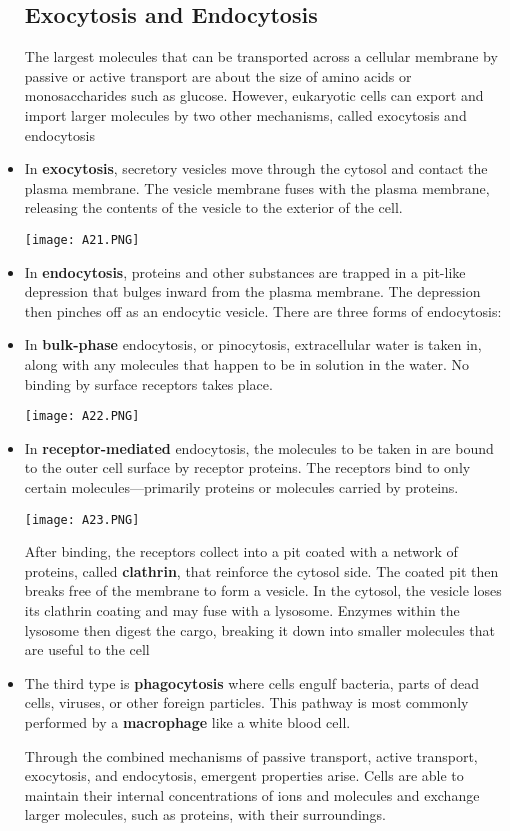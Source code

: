 \documentclass[letterpaper]{article}
\begin{document}
\begin{itemize}
\subsection{Exocytosis and Endocytosis}
\begin{idea}
    The largest molecules that can be transported across a cellular membrane by passive or active transport are about the size of amino acids or monosaccharides such as glucose. However, eukaryotic cells can export and import larger molecules by two other mechanisms, called exocytosis and endocytosis
\end{idea}
\item In \textbf{exocytosis}, secretory vesicles move through the cytosol and contact the plasma membrane. The vesicle membrane fuses with the plasma membrane, releasing the contents of the vesicle to the exterior of the cell.
\begin{center}\texttt{[image: A21.PNG]}\end{center}
\item In \textbf{endocytosis}, proteins and other substances are trapped in a pit-like depression that bulges inward from the plasma membrane. The depression then pinches off as an endocytic vesicle. There are three forms of endocytosis:
\item In \textbf{bulk-phase} endocytosis, or pinocytosis, extracellular water is taken in, along with any molecules that happen to be in solution in the water. No binding by surface receptors takes place.
\begin{center}\texttt{[image: A22.PNG]}\end{center}
\item In \textbf{receptor-mediated} endocytosis, the molecules
to be taken in are bound to the outer cell surface by receptor proteins. The receptors bind to only certain molecules—primarily proteins or molecules carried by proteins.
\begin{center}\texttt{[image: A23.PNG]}\end{center}
After binding, the receptors collect into a pit coated with a network of proteins, called \textbf{clathrin}, that reinforce the cytosol side. The coated pit then breaks free of the membrane to form a vesicle. In the cytosol, the vesicle loses its clathrin coating and may fuse with a lysosome. Enzymes within the lysosome then digest the cargo, breaking it down into smaller molecules that are useful to the cell
\item The third type is \textbf{phagocytosis} where cells engulf bacteria, parts of dead cells, viruses, or other foreign particles. This pathway is most commonly performed by a \textbf{macrophage} like a white blood cell.
\begin{review}
    Through the combined mechanisms of passive transport, active transport, exocytosis, and endocytosis, emergent properties arise. Cells are able to maintain their internal concentrations of ions and molecules and exchange larger molecules, such as proteins, with their surroundings.
\end{review}
\end{itemize}
\end{document}
